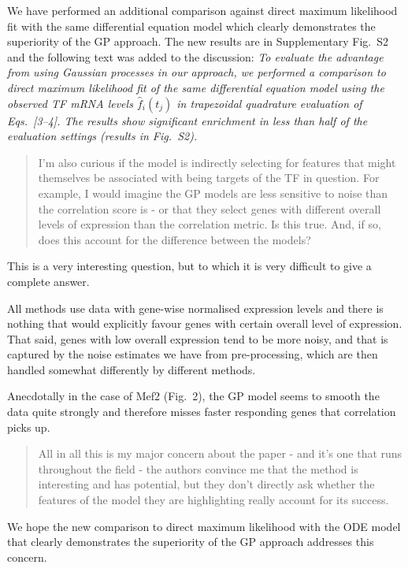 \documentclass{article}
\begin{document}
We have performed an additional comparison against direct maximum
likelihood fit with the same differential equation model which clearly
demonstrates the superiority of the GP approach.  The new results are
in Supplementary Fig.~S2 and the following text was added to the
discussion:
\emph{To evaluate the advantage from using Gaussian processes in our
approach, we performed a comparison to direct maximum likelihood fit
of the same differential equation model using the observed TF mRNA
levels $\hat{f}_i(t_j)$ in trapezoidal quadrature evaluation of
Eqs.~[3--4].  The
results show significant enrichment in less than half of
the evaluation settings (results in Fig.~S2).}

\begin{quote} I'm also curious if the model is indirectly
    selecting for features that might themselves be associated with
    being targets of the TF in question. For example, I would imagine
    the GP models are less sensitive to noise than the correlation
    score is - or that they select genes with different overall levels
    of expression than the correlation metric. Is this true. And, if
    so, does this account for the difference between the models?
\end{quote}

This is a very interesting question, but to which it is very difficult
to give a complete answer.

All methods use data with gene-wise normalised expression levels and
there is nothing that would explicitly favour genes with certain
overall level of expression.  That said, genes with low overall
expression tend to be more noisy, and that is captured by the noise
estimates we have from pre-processing, which are then handled somewhat
differently by different methods.

Anecdotally in the case of Mef2 (Fig.~2), the GP model seems to smooth
the data quite strongly and therefore misses faster responding genes
that correlation picks up.


\begin{quote} All in all this is my major concern about the
    paper - and it's one that runs throughout the field - the authors
    convince me that the method is interesting and has potential, but
    they don't directly ask whether the features of the model they are
    highlighting really account for its success.
\end{quote}

We hope the new comparison to direct maximum likelihood with the ODE
model that clearly demonstrates the superiority of the GP approach
addresses this concern.

\end{document}
